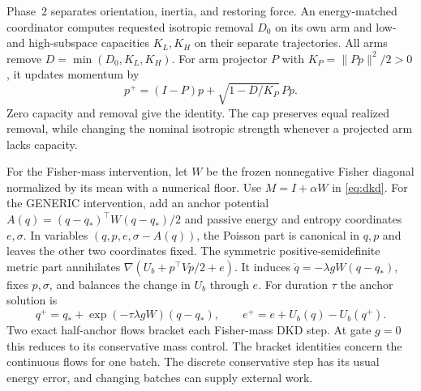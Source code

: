 Phase~2 separates orientation, inertia, and restoring force.
An energy-matched coordinator computes requested isotropic
removal \(D_0\) on its own arm and low- and high-subspace
capacities \(K_L,K_H\) on their separate trajectories. All arms
remove \(D=\min(D_0,K_L,K_H)\). For arm projector \(P\) with
\(K_P=\|Pp\|^2/2>0\), it updates momentum by
\[
  p^+=(I-P)p+\sqrt{1-D/K_P}\,Pp .
\]
Zero capacity and removal give the identity. The cap preserves
equal realized removal, while changing the nominal isotropic
strength whenever a projected arm lacks capacity.

For the Fisher-mass intervention, let \(W\) be the frozen nonnegative
Fisher diagonal normalized by its mean with a numerical floor.
Use \(M=I+\alpha W\) in \eqref{eq:dkd}. For the GENERIC
intervention, add an anchor potential
\(A(q)=(q-q_*)^\top W(q-q_*)/2\) and passive energy and entropy
coordinates \(e,\sigma\). In variables
\((q,p,e,\sigma-A(q))\), the Poisson part is canonical in \(q,p\)
and leaves the other two coordinates fixed. The symmetric
positive-semidefinite metric part annihilates
\(\nabla(U_b+p^\top Vp/2+e)\). It induces
\(\dot q=-\lambda g W(q-q_*)\), fixes \(p,\sigma\), and
balances the change in \(U_b\) through \(e\). For duration \(\tau\)
the anchor solution is
\[
 q^+=q_*+\exp(-\tau\lambda g W)(q-q_*),\qquad
 e^+=e+U_b(q)-U_b(q^+) .
\]
Two exact half-anchor flows bracket each Fisher-mass DKD step.
At gate \(g=0\) this reduces to its conservative mass control.
The bracket identities concern the continuous flows for one batch.
The discrete conservative step has its usual energy error, and
changing batches can supply external work.
